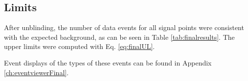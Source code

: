 \subsection{Limits}
\label{subsec:limits}
After unblinding, the number of data events for all signal points were consistent with the expected background, as can be seen in Table \ref{tab:finalresults}. The upper limits were computed with Eq. \ref{eq:finalUL}.

Event displays of the types of these events can be found in Appendix \ref{ch:eventviewerFinal}.


\begin{table}[]
\centering
\renewcommand{\arraystretch}{1.5}
\caption{Final results of the upper limit computations. For the signal, we show the expected rate from a $10^{-14} \ \textrm{cm}^{-2} \textrm{s}^{-1} \textrm{sr}^{-1}$ flux and both background and signal are normalized to the total livetime of the full dataset.}
\label{tab:finalresults}
\end{table}
